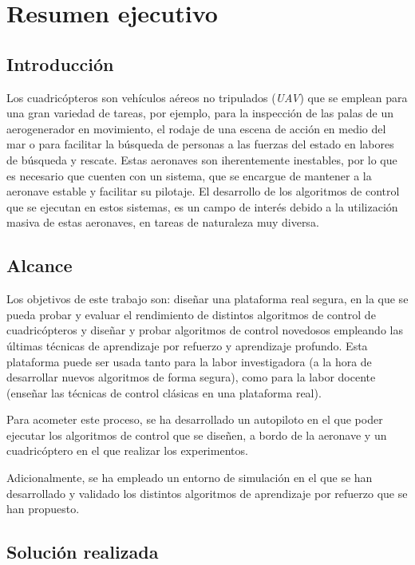 \chapter*{Resumen ejecutivo}
\section*{Introducción}
Los cuadricópteros son vehículos aéreos no tripulados (\textit{UAV}) que se emplean para una gran variedad de tareas, por ejemplo, para la inspección de las palas de un aerogenerador en movimiento, el rodaje de una escena de acción en medio del mar o para facilitar la búsqueda de personas a las fuerzas del estado en labores de búsqueda y rescate. Estas aeronaves son iherentemente inestables, por lo que es necesario que cuenten con un sistema, que se encargue de mantener a la aeronave estable y facilitar su pilotaje. El desarrollo de los algoritmos de control que se ejecutan en estos sistemas, es un campo de interés debido a la utilización masiva de estas aeronaves, en tareas de naturaleza muy diversa.

\section*{Alcance}

Los objetivos de este trabajo son: diseñar una plataforma real segura, en la que se pueda probar y evaluar el rendimiento de distintos algoritmos de control de cuadricópteros y diseñar y probar algoritmos de control novedosos empleando las últimas técnicas de aprendizaje por refuerzo y aprendizaje profundo. Esta plataforma puede ser usada tanto para la labor investigadora (a la hora de desarrollar nuevos algoritmos de forma segura), como para la labor docente (enseñar las técnicas de control clásicas en una plataforma real).

Para acometer este proceso, se ha desarrollado un autopiloto en el que poder ejecutar los algoritmos de control que se diseñen, a bordo de la aeronave y un cuadricóptero en el que realizar los experimentos.

Adicionalmente, se ha empleado un entorno de simulación en el que se han desarrollado y validado los distintos algoritmos de aprendizaje por refuerzo que se han propuesto.

\section*{Solución realizada}

